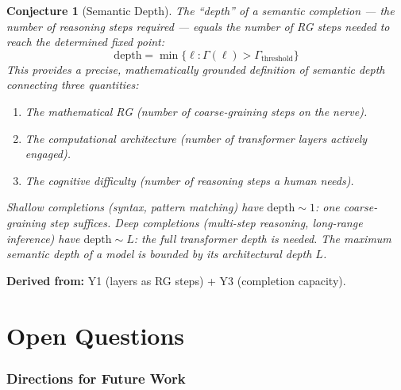 \documentclass[11pt,letterpaper]{article}
\newtheorem{conjecture}{Conjecture}[section]
\begin{document}
\begin{conjecture}[Semantic 
Depth]\label{conj:semantic_depth}
The ``depth'' of a semantic completion --- the number of reasoning 
steps required --- equals the number of RG steps needed to reach 
the determined fixed point:
\begin{equation}\label{eq:semantic_depth}
    \mathrm{depth} = \min\{\ell : 
    \Gamma(\ell) > \Gamma_{\mathrm{threshold}}\}
\end{equation}
This provides a precise, mathematically grounded definition of 
\emph{semantic depth} connecting three quantities:

\begin{enumerate}[label=(\roman*)]
    \item The mathematical RG (number of coarse-graining steps on 
    the nerve).
    \item The computational architecture (number of transformer 
    layers actively engaged).
    \item The cognitive difficulty (number of reasoning steps a 
    human needs).
\end{enumerate}

Shallow completions (syntax, pattern matching) have 
$\mathrm{depth} \sim 1$: one coarse-graining step suffices. 
Deep completions (multi-step reasoning, long-range inference) have 
$\mathrm{depth} \sim L$: the full transformer depth is needed. The 
maximum semantic depth of a model is bounded by its architectural 
depth $L$.
\end{conjecture}

\textbf{Derived from:} Y1 (layers as RG steps) + Y3 (completion 
capacity).

\newpage
\part{Open Questions}

\section{Directions for Future Work}
\end{document}

